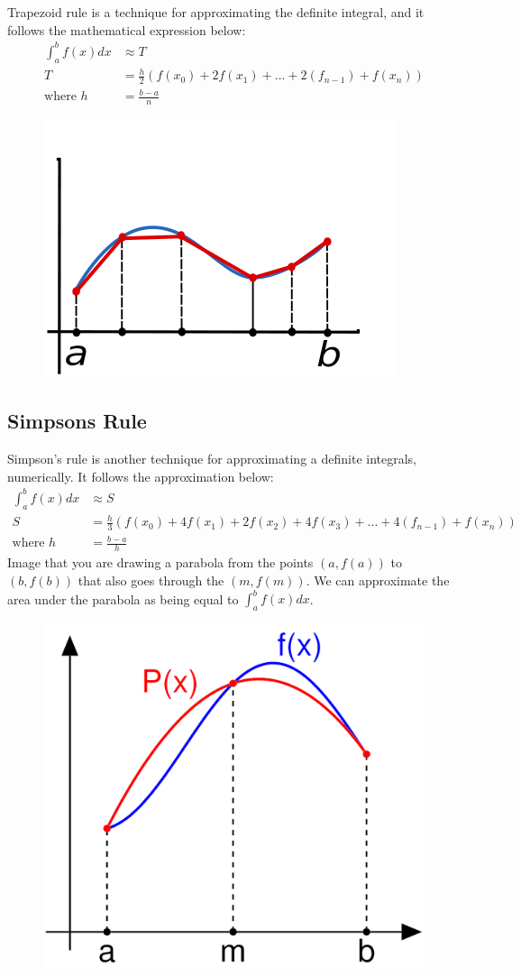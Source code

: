 \documentclass[
]{article}
\begin{document}
Trapezoid rule is a technique for approximating the definite integral,
and it follows the mathematical expression below: \begin{align*} 
 \int_a^b f(x) dx &\approx T\\
T &= \frac{h}{2}(f(x_0) + 2f(x_1) + ... + 2(f_{n-1}) + f(x_n))\\
\text{where } h &= \frac{b-a}{n} 
\end{align*}

\begin{figure}[h!]\centering 
\includegraphics[width=0.6\linewidth]{trapezoidal_rule_illustration.png} 
\end{figure}

\subsection*{Simpsons Rule}

Simpson's rule is another technique for approximating a definite
integrals, numerically. It follows the approximation below:
\begin{align*} 
 \int_a^b f(x) dx &\approx S\\
S &= \frac{h}{3}(f(x_0) + 4f(x_1) + 2f(x_2) + 4f(x_3) +  ... + 4(f_{n-1}) + f(x_n))\\
\text{where } h &= \frac{b-a}{h} 
\end{align*} Image that you are drawing a parabola from the points
\((a, f(a))\) to \((b, f(b))\) that also goes through the \((m, f(m))\).
We can approximate the area under the parabola as being equal to
\(\int_a^b f(x) dx\).

\begin{figure}[h!]\centering 
\includegraphics[width=0.6\linewidth]{Simpsons_method_illustration.png} 
\end{figure}
\end{document}
